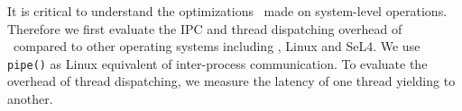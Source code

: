
It is critical to understand the optimizations \name\ made on system-level operations.
Therefore we first evaluate the IPC and thread dispatching overhead of \name\ compared to other operating systems including \cos, Linux and SeL4.
We use {\tt pipe()} as Linux equivalent of inter-process communication.
To evaluate the overhead of thread dispatching, we measure the latency of one thread yielding to another.

